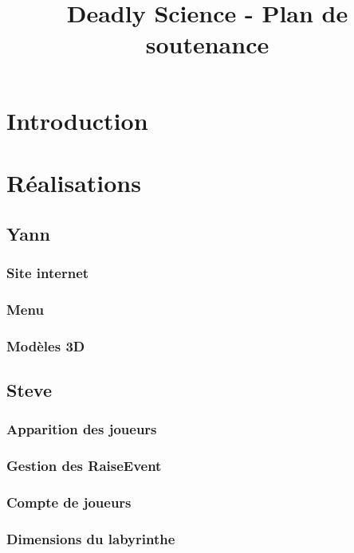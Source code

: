 \documentclass{article}
\title{Deadly Science - Plan de soutenance}
\begin{document}
\maketitle

\section{Introduction}

\section{Réalisations}

\subsection{Yann}

\subsubsection{Site internet}

\subsubsection{Menu}

\subsubsection{Modèles 3D}

\subsection{Steve}

\subsubsection{Apparition des joueurs}

\subsubsection{Gestion des RaiseEvent}

\subsubsection{Compte de joueurs}

\subsubsection{Dimensions du labyrinthe}
\end{document}
